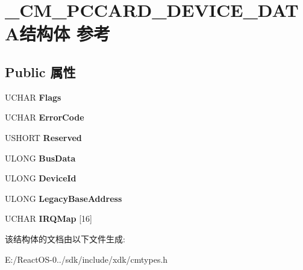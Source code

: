 \hypertarget{struct___c_m___p_c_c_a_r_d___d_e_v_i_c_e___d_a_t_a}{}\section{\+\_\+\+C\+M\+\_\+\+P\+C\+C\+A\+R\+D\+\_\+\+D\+E\+V\+I\+C\+E\+\_\+\+D\+A\+T\+A结构体 参考}
\label{struct___c_m___p_c_c_a_r_d___d_e_v_i_c_e___d_a_t_a}
\subsection*{Public 属性}
\begin{DoxyCompactItemize}
\item 
\mbox{\label{struct___c_m___p_c_c_a_r_d___d_e_v_i_c_e___d_a_t_a_abef5544ce11cd2ec23b442c298946314}} 
U\+C\+H\+AR {\bfseries Flags}
\item 
\mbox{\label{struct___c_m___p_c_c_a_r_d___d_e_v_i_c_e___d_a_t_a_a0715e9493c9fbe6fc98b906d5f2417de}} 
U\+C\+H\+AR {\bfseries Error\+Code}
\item 
\mbox{\label{struct___c_m___p_c_c_a_r_d___d_e_v_i_c_e___d_a_t_a_a3f613d92ba62ba0044bb3c9c24ad2b6b}} 
U\+S\+H\+O\+RT {\bfseries Reserved}
\item 
\mbox{\label{struct___c_m___p_c_c_a_r_d___d_e_v_i_c_e___d_a_t_a_aae08d7caf845badd3cdc55f9c8080e44}} 
U\+L\+O\+NG {\bfseries Bus\+Data}
\item 
\mbox{\label{struct___c_m___p_c_c_a_r_d___d_e_v_i_c_e___d_a_t_a_a3456f0ef599363ce64871a8a680a3966}} 
U\+L\+O\+NG {\bfseries Device\+Id}
\item 
\mbox{\label{struct___c_m___p_c_c_a_r_d___d_e_v_i_c_e___d_a_t_a_a42347dda3a1a7024c210f18d63a35990}} 
U\+L\+O\+NG {\bfseries Legacy\+Base\+Address}
\item 
\mbox{\label{struct___c_m___p_c_c_a_r_d___d_e_v_i_c_e___d_a_t_a_ab6a443e8c262f04d8e5b8e2d4d987b44}} 
U\+C\+H\+AR {\bfseries I\+R\+Q\+Map} \mbox{[}16\mbox{]}
\end{DoxyCompactItemize}


该结构体的文档由以下文件生成\+:\begin{DoxyCompactItemize}
\item 
E\+:/\+React\+O\+S-\/0../sdk/include/xdk/cmtypes.\+h\end{DoxyCompactItemize}
